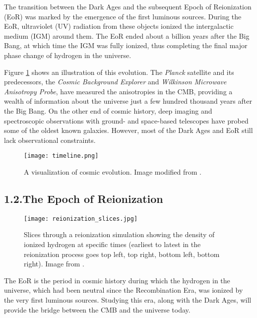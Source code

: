 \documentclass[12pt]{article}
\begin{document}
The transition between the Dark Ages and the subsequent Epoch of Reionization (EoR) was marked by the emergence of the first luminous sources. During the EoR, ultraviolet (UV) radiation from these objects ionized the intergalactic medium (IGM) around them. The EoR ended about a billion years after the Big Bang, at which time the IGM was fully ionized, thus completing the final major phase change of hydrogen in the universe.

Figure \ref{fig:timeline} shows an illustration of this evolution. The \textit{Planck} satellite and its predecessors, the \textit{Cosmic Background Explorer} and \textit{Wilkinson Microwave Anisotropy Probe}, have measured the anisotropies in the CMB, providing a wealth of information about the universe just a few hundred thousand years after the Big Bang. On the other end of cosmic history, deep imaging and spectroscopic observations with ground- and space-based telescopes have probed some of the oldest known galaxies. However, most of the Dark Ages and EoR still lack observational constraints. \vspace{3mm}

\begin{figure}[tb]
	\centering
	\texttt{[image: timeline.png]}
	\caption[History of the universe]{A visualization of cosmic evolution. Image modified from \cite{loeb2006}.}
	\label{fig:timeline}
\end{figure}

\tocless\subsection{\hypertarget{subsec:eor}{1.2.\hspace{0.75em}The Epoch of Reionization}}

\begin{figure}[t]
	\centering
	\texttt{[image: reionization\_slices.jpg]}
	\caption[Redshift slices through a simulation showing the evolution of ionized hydrogen]{Slices through a reionization simulation showing the density of ionized hydrogen at specific times (earliest to latest in the reionization process goes top left, top right, bottom left, bottom right). Image from \cite{trac2007}.}
	\label{fig:reionization}
\end{figure}

The EoR is the period in cosmic history during which the hydrogen in the universe, which had been neutral since the Recombination Era, was ionized by the very first luminous sources. Studying this era, along with the Dark Ages, will provide the bridge between the CMB and the universe today.
\end{document}
